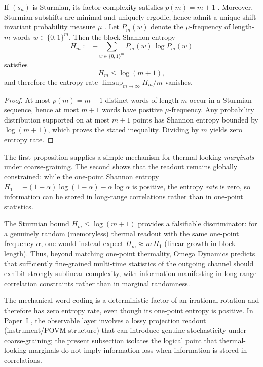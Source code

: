 \begin{proposition}
If $(s_n)$ is Sturmian, its factor complexity satisfies $p(m)=m+1$ \cite{MorseHedlund1940, Lothaire2002}. Moreover, Sturmian subshifts are minimal and uniquely ergodic, hence admit a unique shift-invariant probability measure $\mu$ \cite{LindMarcus1995, KatokHasselblatt1995}. Let $P_m(w)$ denote the $\mu$-frequency of length-$m$ words $w\in\{0,1\}^m$. Then the block Shannon entropy
\begin{equation}
  H_m:=-\sum_{w\in\{0,1\}^m} P_m(w)\,\log P_m(w)
\end{equation}
satisfies
\begin{equation}
  H_m \le \log(m+1),
\end{equation}
and therefore the entropy rate $\limsup_{m\to\infty}H_m/m$ vanishes.
\end{proposition}
\begin{proof}
At most $p(m)=m+1$ distinct words of length $m$ occur in a Sturmian sequence, hence at most $m+1$ words have positive $\mu$-frequency. Any probability distribution supported on at most $m+1$ points has Shannon entropy bounded by $\log(m+1)$, which proves the stated inequality. Dividing by $m$ yields zero entropy rate.
\end{proof}

The first proposition supplies a simple mechanism for thermal-looking \emph{marginals} under coarse-graining. The second shows that the readout remains globally constrained: while the one-point Shannon entropy $H_1=-(1-\alpha)\log(1-\alpha)-\alpha\log\alpha$ is positive, the entropy \emph{rate} is zero, so information can be stored in long-range correlations rather than in one-point statistics.

\begin{remark}
The Sturmian bound $H_m\le \log(m+1)$ provides a falsifiable discriminator: for a genuinely random (memoryless) thermal readout with the same one-point frequency $\alpha$, one would instead expect $H_m\approx m\,H_1$ (linear growth in block length). Thus, beyond matching one-point thermality, Omega Dynamics predicts that sufficiently fine-grained multi-time statistics of the outgoing channel should exhibit strongly sublinear complexity, with information manifesting in long-range correlation constraints rather than in marginal randomness.
\end{remark}

\begin{remark}
The mechanical-word coding is a deterministic factor of an irrational rotation and therefore has zero entropy rate, even though its one-point entropy is positive. In Paper~I \cite{Ma2025HPA}, the observable layer involves a lossy projection readout (instrument/POVM structure) that can introduce genuine stochasticity under coarse-graining; the present subsection isolates the logical point that thermal-looking marginals do not imply information loss when information is stored in correlations.
\end{remark}

